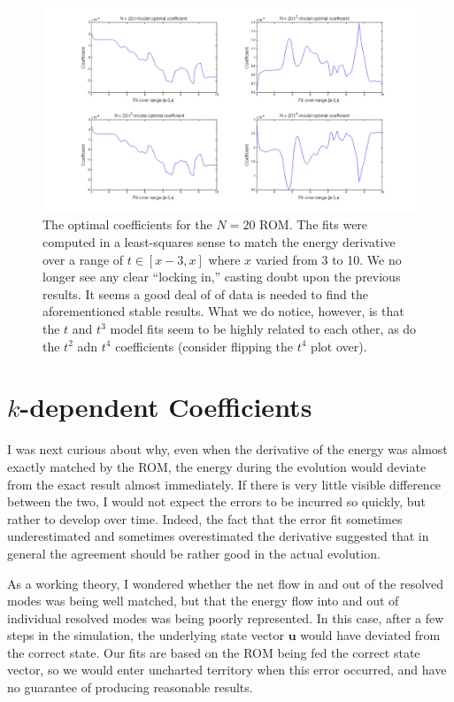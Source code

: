 \documentclass{article}
\begin{document}
\begin{figure}[h]
\includegraphics[width=\textwidth]{coeffs_20_2.png}
\caption{The optimal coefficients for the $N=20$ ROM. The fits were computed in a least-squares sense to match the energy derivative over a range of $t\in[x-3,x]$ where $x$ varied from 3 to 10. We no longer see any clear ``locking in,'' casting doubt upon the previous results. It seems a good deal of of data is needed to find the aforementioned stable results. What we do notice, however, is that the $t$ and $t^3$ model fits seem to be highly related to each other, as do the $t^2$ adn $t^4$ coefficients (consider flipping the $t^4$ plot over).}\label{fig:20_coeffs_2}
\end{figure}

\section{$k$-dependent Coefficients}

I was next curious about why, even when the derivative of the energy was almost exactly matched by the ROM, the energy during the evolution would deviate from the exact result almost immediately. If there is very little visible difference between the two, I would not expect the errors to be incurred so quickly, but rather to develop over time. Indeed, the fact that the error fit sometimes underestimated and sometimes overestimated the derivative suggested that in general the agreement should be rather good in the actual evolution.

As a working theory, I wondered whether the net flow in and out of the resolved modes was being well matched, but that the energy flow into and out of individual resolved modes was being poorly represented. In this case, after a few steps in the simulation, the underlying state vector $\mathbf{u}$ would have deviated from the correct state. Our fits are based on the ROM being fed the correct state vector, so we would enter uncharted territory when this error occurred, and have no guarantee of producing reasonable results.
\end{document}
